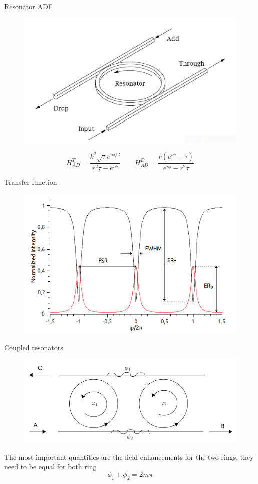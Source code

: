 \documentclass{beamer}
\begin{document}
\begin{frame}[plain]{Resonator ADF}
\begin{figure}
\centering
\includegraphics[width =.6\textwidth]{ADFfigo}
\end{figure}
\vspace{2em}
\begin{equation}H^T_{AD} = \frac{k^2\sqrt{\tau} e^{i\phi/2}}{r^2\tau -e^{i\phi}}\qquad H^D_{AD}  = \frac{r(e^{i\phi} - \tau)}{e^{i\phi}-r^2\tau} \end{equation}
\end{frame}



\begin{frame}[plain]{Transfer function}
\begin{figure}
\centering
\includegraphics[width =.8\textwidth]{transferfunction}
\end{figure}
\end{frame}


\begin{frame}[plain]{Coupled resonators}
\begin{figure}
\centering
\includegraphics[width =.6\textwidth]{coupled}
\end{figure}
\vspace{2em}
The most important quantities are the field enhancements for the two rings, they need to be equal for both ring 
\[\phi_1 + \phi_2 = 2m\pi\]
\end{frame}
\end{document}
